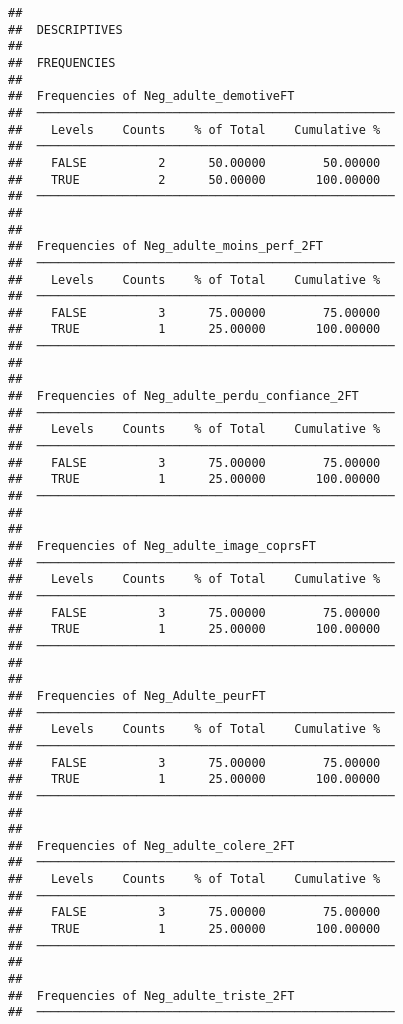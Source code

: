 \documentclass[
]{article}
\begin{document}
\begin{verbatim}
## 
##  DESCRIPTIVES
## 
##  FREQUENCIES
## 
##  Frequencies of Neg_adulte_demotiveFT               
##  ────────────────────────────────────────────────── 
##    Levels    Counts    % of Total    Cumulative %   
##  ────────────────────────────────────────────────── 
##    FALSE          2      50.00000        50.00000   
##    TRUE           2      50.00000       100.00000   
##  ────────────────────────────────────────────────── 
## 
## 
##  Frequencies of Neg_adulte_moins_perf_2FT           
##  ────────────────────────────────────────────────── 
##    Levels    Counts    % of Total    Cumulative %   
##  ────────────────────────────────────────────────── 
##    FALSE          3      75.00000        75.00000   
##    TRUE           1      25.00000       100.00000   
##  ────────────────────────────────────────────────── 
## 
## 
##  Frequencies of Neg_adulte_perdu_confiance_2FT      
##  ────────────────────────────────────────────────── 
##    Levels    Counts    % of Total    Cumulative %   
##  ────────────────────────────────────────────────── 
##    FALSE          3      75.00000        75.00000   
##    TRUE           1      25.00000       100.00000   
##  ────────────────────────────────────────────────── 
## 
## 
##  Frequencies of Neg_adulte_image_coprsFT            
##  ────────────────────────────────────────────────── 
##    Levels    Counts    % of Total    Cumulative %   
##  ────────────────────────────────────────────────── 
##    FALSE          3      75.00000        75.00000   
##    TRUE           1      25.00000       100.00000   
##  ────────────────────────────────────────────────── 
## 
## 
##  Frequencies of Neg_Adulte_peurFT                   
##  ────────────────────────────────────────────────── 
##    Levels    Counts    % of Total    Cumulative %   
##  ────────────────────────────────────────────────── 
##    FALSE          3      75.00000        75.00000   
##    TRUE           1      25.00000       100.00000   
##  ────────────────────────────────────────────────── 
## 
## 
##  Frequencies of Neg_adulte_colere_2FT               
##  ────────────────────────────────────────────────── 
##    Levels    Counts    % of Total    Cumulative %   
##  ────────────────────────────────────────────────── 
##    FALSE          3      75.00000        75.00000   
##    TRUE           1      25.00000       100.00000   
##  ────────────────────────────────────────────────── 
## 
## 
##  Frequencies of Neg_adulte_triste_2FT               
##  ────────────────────────────────────────────────── 

\end{verbatim}
\end{document}
